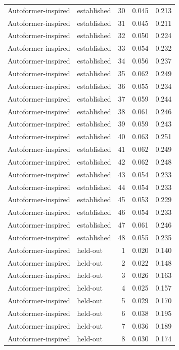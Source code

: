 \begin{tabular}{llrrr}
Autoformer-inspired & established & 30 & 0.045 & 0.213 \\
Autoformer-inspired & established & 31 & 0.045 & 0.211 \\
Autoformer-inspired & established & 32 & 0.050 & 0.224 \\
Autoformer-inspired & established & 33 & 0.054 & 0.232 \\
Autoformer-inspired & established & 34 & 0.056 & 0.237 \\
Autoformer-inspired & established & 35 & 0.062 & 0.249 \\
Autoformer-inspired & established & 36 & 0.055 & 0.234 \\
Autoformer-inspired & established & 37 & 0.059 & 0.244 \\
Autoformer-inspired & established & 38 & 0.061 & 0.246 \\
Autoformer-inspired & established & 39 & 0.059 & 0.243 \\
Autoformer-inspired & established & 40 & 0.063 & 0.251 \\
Autoformer-inspired & established & 41 & 0.062 & 0.249 \\
Autoformer-inspired & established & 42 & 0.062 & 0.248 \\
Autoformer-inspired & established & 43 & 0.054 & 0.233 \\
Autoformer-inspired & established & 44 & 0.054 & 0.233 \\
Autoformer-inspired & established & 45 & 0.053 & 0.229 \\
Autoformer-inspired & established & 46 & 0.054 & 0.233 \\
Autoformer-inspired & established & 47 & 0.061 & 0.246 \\
Autoformer-inspired & established & 48 & 0.055 & 0.235 \\
Autoformer-inspired & held-out & 1 & 0.020 & 0.140 \\
Autoformer-inspired & held-out & 2 & 0.022 & 0.148 \\
Autoformer-inspired & held-out & 3 & 0.026 & 0.163 \\
Autoformer-inspired & held-out & 4 & 0.025 & 0.157 \\
Autoformer-inspired & held-out & 5 & 0.029 & 0.170 \\
Autoformer-inspired & held-out & 6 & 0.038 & 0.195 \\
Autoformer-inspired & held-out & 7 & 0.036 & 0.189 \\
Autoformer-inspired & held-out & 8 & 0.030 & 0.174 \\

\end{tabular}
